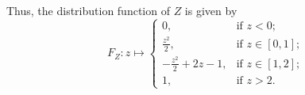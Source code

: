 Thus, the distribution function of $Z$ is given by
\[
    F_Z: z \mapsto
    \begin{cases}
        0,                          &\text{if }z  < 0; \\
        \frac{z^2}{2},              &\text{if }z \in [0,1]; \\
        - \frac{z^2}{2} + 2z - 1,   &\text{if }z \in [1,2]; \\
        1,                          &\text{if }z > 2.
    \end{cases}
\]
